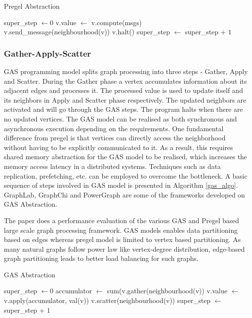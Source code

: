 \begin{algorithm}
\caption{Pregel Abstraction}
\label{vertex_algo}
\begin{algorithmic}[1]
  \State super\_step $\gets 0$
      \State v.value $\gets$ v.compute(msgs) 
      \State v.send\_message(neighbourhood(v))
      \State v.halt()
    \EndFor
  \EndWhile
  \State super\_step $\gets$ super\_step + $1$

\end{algorithmic}
\end{algorithm}

\subsubsection{Gather-Apply-Scatter}
GAS \cite{PowerGraph} programming model splits graph processing into three steps - Gather, Apply and Scatter. During the Gather phase a vertex accumulates information about its adjacent edges and processes it. The processed value is used to update itself and its neighbors in Apply and Scatter phase respectively. The updated neighbors are activated and will go through the GAS steps. The program halts when there are no updated vertices. The GAS model can be realised as both synchronous and asynchronous execution depending on the requirements. One fundamental difference from pregel is that vertices can directly access the neighborhood without having to be explicitly communicated to it. As a result, this requires shared memory abstraction for the GAS model to be realised, which increases the memory access latency in a distributed systems. Techniques such as data replication, prefetching, etc. can be employed to overcome the bottleneck. A basic sequence of steps involved in GAS model is presented in Algorithm \ref{gas_algo}. GraphLab, GraphChi and PowerGraph are some of the frameworks developed on GAS Abstraction. 

The paper \cite{graphFwSurvey} does a performance evaluation of the various GAS and Pregel based large scale graph processing framework. GAS models enables data partitioning based on edges whereas pregel model is limited to vertex based partitioning. As many natural graphs follow power law like vertex-degree distribution, edge-based graph partitioning leads to better load balancing for such graphs.

\begin{algorithm}
\caption{GAS Abstraction}
\label{gas_algo}
\begin{algorithmic}[1]
  \State super\_step $\gets 0$
      \State accumulator $\gets$ sum(v.gather(neighbourhood(v))
      \State v.value $\gets$ v.apply(accumulator, val(v))
      \State v.scatter(neighbourhood(v))
    \EndFor
  \EndWhile
  \State super\_step $\gets$ super\_step + $1$

\end{algorithmic}
\end{algorithm}

